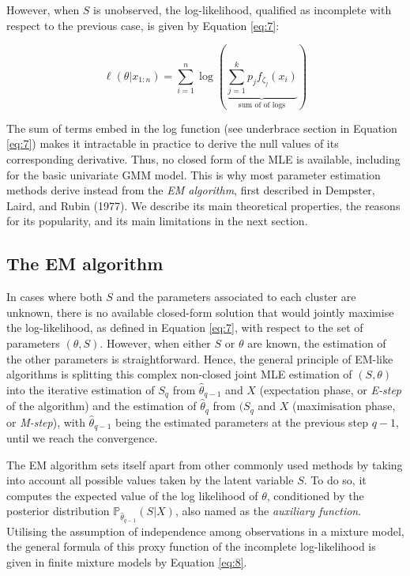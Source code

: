 However, when \(S\) is unobserved, the log-likelihood, qualified as
incomplete with respect to the previous case, is given by Equation
\eqref{eq:7}:

\begin{equation}
\ell (\theta \vert x_{1:n}) = \sum_{i=1}^n  \log \left( \underbrace{\sum_{j=1}^k  p_j f_{\zeta_j}(x_i)}_{\text{sum of of logs}} \right)
\label{eq:7}
\end{equation}

The sum of terms embed in the log function (see underbrace section in Equation \eqref{eq:7}) makes it intractable in practice to derive the null values of its corresponding derivative. Thus, no closed form of the MLE is available,
including for the basic univariate GMM model. This is why most
parameter estimation methods derive instead from the \emph{EM algorithm},
first described in Dempster, Laird, and Rubin (1977). We describe its main theoretical properties, the reasons for its popularity, and its main limitations in the next section.

\hypertarget{the-em-algorithm}{%
\subsection{The EM algorithm}\label{the-em-algorithm}}

In cases where both \(S\) and the parameters associated to each cluster are unknown, there is no available closed-form solution that would jointly maximise the log-likelihood, as defined in Equation \eqref{eq:7}, with respect to the set of parameters \(({\theta}, S)\).
However, when either \(S\) or \(\theta\) are known, the estimation of the
other parameters is straightforward. Hence, the general principle of
EM-like algorithms is splitting this complex non-closed joint MLE
estimation of \((S, \theta)\) into the iterative estimation of \(S_q\) from
\(\hat{\theta}_{q-1}\) and \(X\) (expectation phase, or \emph{E-step} of the algorithm)
and the estimation of \(\hat{\theta}_{q}\) from \((S_q\) and \(X\) (maximisation phase, or \emph{M-step}), with \(\hat{\theta}_{q-1}\) being the estimated parameters at the
previous step \(q-1\), until we reach the convergence.

The EM algorithm sets itself apart from other commonly used methods by taking
into account all possible values taken by the latent variable \(S\). To do
so, it computes the expected value of the log likelihood of \(\theta\),
conditioned by the posterior distribution
\(\mathbb{P}_{\hat{\theta}_{q-1}} (S|X)\), also named as the \emph{auxiliary
function}. Utilising the assumption of independence among observations in a mixture model, the general formula of this proxy
function of the incomplete log-likelihood is given in finite mixture
models by Equation \eqref{eq:8}.

